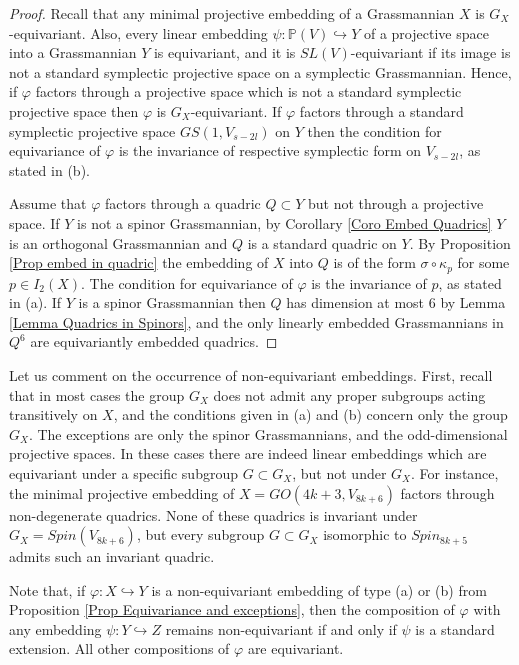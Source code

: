 \documentclass[12pt]{amsart}
\def\PP {{\mathbb P}}     %
\def\hw  {\hookrightarrow}
\begin{document}
\begin{proof}
Recall that any minimal projective embedding of a Grassmannian $X$ is $G_X$-equivariant. Also, every linear embedding $\psi:\PP(V)\hw Y$ of a projective space into a Grassmannian $Y$ is equivariant, and it is $SL(V)$-equivariant if its image is not a standard symplectic projective space on a symplectic Grassmannian. Hence, if $\varphi$ factors through a projective space which is not a standard symplectic projective space then $\varphi$ is $G_X$-equivariant. If $\varphi$ factors through a standard symplectic projective space $GS(1,V_{s-2l})$ on $Y$ then the condition for equivariance of $\varphi$ is the invariance of respective symplectic form on $V_{s-2l}$, as stated in (b).

Assume that $\varphi$ factors through a quadric $Q\subset Y$ but not through a projective space. If $Y$ is not a spinor Grassmannian, by Corollary \ref{Coro Embed Quadrics} $Y$ is an orthogonal Grassmannian and $Q$ is a standard quadric on $Y$. By Proposition \ref{Prop embed in quadric} the embedding of $X$ into $Q$ is of the form $\sigma\circ\kappa_p$ for some $p\in I_2(X)$. The condition for equivariance of $\varphi$ is the invariance of $p$, as stated in (a). If $Y$ is a spinor Grassmannian then $Q$ has dimension at most $6$ by Lemma \ref{Lemma Quadrics in Spinors}, and the only linearly embedded Grassmannians in $Q^6$ are equivariantly embedded quadrics.
\end{proof}


Let us comment on the occurrence of non-equivariant embeddings. First, recall that in most cases the group $G_X$ does not admit any proper subgroups acting transitively on $X$, and the conditions given in (a) and (b) concern only the group $G_X$. The exceptions are only the spinor  Grassmannians, and the odd-dimensional projective spaces. In these cases there are indeed linear embeddings which are equivariant under a specific subgroup $G\subset G_X$, but not under $G_X$. For instance, the minimal projective embedding of $X=GO(4k+3,V_{8k+6})$ factors through non-degenerate quadrics. None of these quadrics is invariant under $G_X=Spin(V_{8k+6})$, but every subgroup $G\subset G_X$ isomorphic to $Spin_{8k+5}$ admits such an invariant quadric.

Note that, if $\varphi:X\hookrightarrow Y$ is a non-equivariant embedding of type (a) or (b) from Proposition \ref{Prop Equivariance and exceptions}, then the composition of $\varphi$ with any embedding $\psi:Y \hookrightarrow Z$ remains non-equivariant if and only if $\psi$ is a standard extension. All other compositions of $\varphi$ are equivariant.
\end{document}
